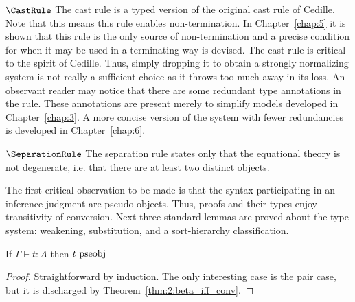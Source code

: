 $\CastRule$ The cast rule is a typed version of the original cast rule of Cedille.
Note that this means this rule enables non-termination.
In Chapter~\ref{chap:5} it is shown that this rule is the only source of non-termination and a precise condition for when it may be used in a terminating way is devised.
The cast rule is critical to the spirit of Cedille.
Thus, simply dropping it to obtain a strongly normalizing system is not really a sufficient choice as it throws too much away in its loss.
An observant reader may notice that there are some redundant type annotations in the rule.
These annotations are present merely to simplify models developed in Chapter~\ref{chap:3}.
A more concise version of the system with fewer redundancies is developed in Chapter~\ref{chap:6}.

$\SeparationRule$ The separation rule states only that the equational theory is not degenerate, i.e. that there are at least two distinct objects.



The first critical observation to be made is that the syntax participating in an inference judgment are pseudo-objects.
Thus, proofs and their types enjoy transitivity of conversion.
Next three standard lemmas are proved about the type system: weakening, substitution, and a sort-hierarchy classification.

\begin{lemma}
    If $\Gamma \vdash t : A$ then $t~\textnormal{pseobj}$
    \label{lem:2:infer_implies_pseobj}
\end{lemma}
\begin{proof}
    Straightforward by induction.
    The only interesting case is the pair case, but it is discharged by Theorem~\ref{thm:2:beta_iff_conv}.
\end{proof}

